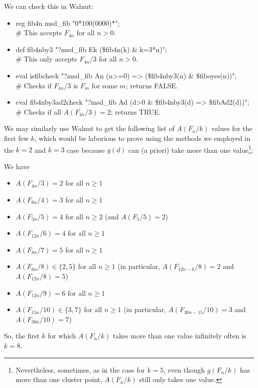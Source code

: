 \documentclass[10pt,a4paper,reqno]{amsart}
\newcommand{\walnut}{{\ttfamily Walnut}}
\begin{document}
We can check this in {\walnut}:
\begin{itemize}
\item {\ttfamily reg fib4n msd\_fib "0*100(0000)*";\\\# This accepts $F_{4n}$ for all $n>0$.}
\item {\ttfamily def fib4nby3 "?msd\_fib Ek (\$fib4n(k) \& k=3*n)";\\\# This only accepts $F_{4n}/3$ for all $n>0$.}
\item {\ttfamily eval isfibcheck "?msd\_fib An (n>=0) => (\$fib4nby3(n) \& \$fiboyes(n))";\\\# Checks if $F_{4n}/3$ is $F_m$ for some $m$; returns FALSE.}
\item {\ttfamily eval fib4nby3ad2check "?msd\_fib Ad (d>0 \& \$fib4nby3(d) => \$fibAd2(d))";\\\# Checks if all $A(F_{4n}/3)=2$; returns TRUE.}
\end{itemize}

We may similarly use {\walnut} to get the following list of $A(F_n/k)$ values for the first few $k$, which would be laborious to prove using the methods we employed in the $k=2$ and $k=3$ case because $g(d)$ can (a priori) take more than one value\footnote{Nevertheless, sometimes, as in the case for $k=5$, even though $g(F_n/k)$ has more than one cluster point, $A(F_n/k)$ still only takes one value.}:

\begin{prop}
We have
\begin{itemize}
\item $A(F_{4n}/3)=2$ for all $n \geq 1$
\item $A(F_{6n}/4)=3$ for all $n \geq 1$
\item $A(F_{5n}/5)=4$ for all $n \geq 2$ \qquad (and $A(F_5/5)=2$)
\item $A(F_{12n}/6)=4$ for all $n \geq 1$
\item $A(F_{8n}/7)=5$ for all $n \geq 1$
\item $A(F_{6n}/8)\in\{2,5\}$ for all $n \geq 1$ \quad (in particular, $A(F_{12n-6}/8)=2$ and $A(F_{12n}/8)=5$)
\item $A(F_{12n}/9)=6$ for all $n \geq 1$
\item $A(F_{15n}/10)\in\{3,7\}$ for all $n \geq 1$ \quad (in particular, $A(F_{30n-15}/10)=3$ and $A(F_{30n}/10)=7$)
\end{itemize}
\end{prop}
So, the first $k$ for which $A(F_n/k)$ takes more than one value infinitely often is $k=8$.
\end{document}

